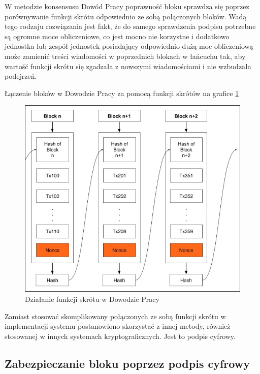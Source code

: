 W metodzie konsensusu Dowód Pracy poprawność bloku sprawdza się poprzez porównywanie funkcji skrótu odpowiednio ze sobą połączonych bloków. Wadą tego rodzaju rozwiązania jest fakt, że do samego sprawdzenia podpisu potrzebne są ogromne moce obliczeniowe, co jest mocno nie korzystne i dodatkowo jednostka lub zespół jednostek posiadający odpowiednio dużą moc obliczeniową może zamienić treści wiadomości w poprzednich blokach w łańcuchu tak, aby wartość funkcji skrótu się zgadzała z nowszymi wiadomościami i nie wzbudzała podejrzeń.

\vspace{0.3\baselineskip}

Łączenie bloków w Dowodzie Pracy za pomocą funkcji skrótów na grafice \ref{fig:ProofOfWorkHash}
\begin{figure}[H]
    \centering
    \includegraphics[width=\textwidth]{Images/ProofOfWorkHash.jpg}
    \caption{Działanie funkcji skrótu w Dowodzie Pracy}
    \label{fig:ProofOfWorkHash}
\end{figure}

Zamiast stosować skomplikowany połączonych ze sobą funkcji skrótu w implementacji systemu postanowiono skorzystać z innej metody, również stosowanej w innych systemach kryptograficznych. Jest to podpis cyfrowy.

\subsection{Zabezpieczanie bloku poprzez podpis cyfrowy}

